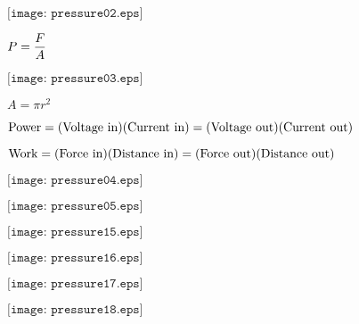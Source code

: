\documentclass[12pt,a4paper,margin=2cm]{book}
\def\lthtmlcheckvsize{\ifdim\ht\sizebox<\vsize 
  \ifdim\wd\sizebox<\hsize\expandafter\hfill\fi \expandafter\vfill
  \else\expandafter\vss\fi}%
\begin{document}
{\newpage\clearpage
{}%
$\displaystyle \texttt{[image: pressure02.eps]}$%
\lthtmlindisplaymathZ
\lthtmlcheckvsize\clearpage}

{\newpage\clearpage
{}%
$\displaystyle P = {F \over A}$%
\lthtmlindisplaymathZ
\lthtmlcheckvsize\clearpage}

{\newpage\clearpage
{}%
$\displaystyle \texttt{[image: pressure03.eps]}$%
\lthtmlindisplaymathZ
\lthtmlcheckvsize\clearpage}

{\newpage\clearpage
{}%
$ A = \pi r^2$%
\lthtmlindisplaymathZ
\lthtmlcheckvsize\clearpage}

{\newpage\clearpage
{}%
$\displaystyle \hbox{Power} = (\hbox{Voltage in}) (\hbox{Current in}) = (\hbox{Voltage out}) (\hbox{Current out})$%
\lthtmlindisplaymathZ
\lthtmlcheckvsize\clearpage}

{\newpage\clearpage
{}%
$\displaystyle \hbox{Work} = (\hbox{Force in}) (\hbox{Distance in}) = (\hbox{Force out}) (\hbox{Distance out})$%
\lthtmlindisplaymathZ
\lthtmlcheckvsize\clearpage}

{\newpage\clearpage
{}%
$\displaystyle \texttt{[image: pressure04.eps]}$%
\lthtmlindisplaymathZ
\lthtmlcheckvsize\clearpage}

{\newpage\clearpage
{}%
$\displaystyle \texttt{[image: pressure05.eps]}$%
\lthtmlindisplaymathZ
\lthtmlcheckvsize\clearpage}

{\newpage\clearpage
{}%
$\displaystyle \texttt{[image: pressure15.eps]}$%
\lthtmlindisplaymathZ
\lthtmlcheckvsize\clearpage}

{\newpage\clearpage
{}%
$\displaystyle \texttt{[image: pressure16.eps]}$%
\lthtmlindisplaymathZ
\lthtmlcheckvsize\clearpage}

{\newpage\clearpage
{}%
$\displaystyle \texttt{[image: pressure17.eps]}$%
\lthtmlindisplaymathZ
\lthtmlcheckvsize\clearpage}

{\newpage\clearpage
{}%
$\displaystyle \texttt{[image: pressure18.eps]}$%
\lthtmlindisplaymathZ
\lthtmlcheckvsize\clearpage}
\end{document}
